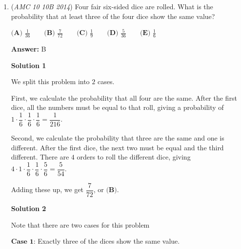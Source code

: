 \begin{enumerate}
WLOG, let $AD = 1$ and $DC = 2$. Furthermore, drop an an altitude from $F$ to $CD$, which meets $CD$ at $X$. Since $\angle ADC$ is right and has been trisected, it follows that $\triangle ADE$ and $\triangle DXF$ are both $30-60-90$ triangles. Therefore, $AE = \frac{\sqrt{3}}{3}$, and $DX = AF = \sqrt{3}$. Hence, it follows that $EF = \sqrt{3} - \frac{\sqrt{3}}{3}= \frac{2\sqrt{3}}{3}$. Since $\angle ADE$ is right, the height and base of $\triangle DEF$ are $1$ and $\frac{2\sqrt{3}}{3}$, respectively. Thus, the area of $\triangle DEF$ is $\frac{\sqrt{3}}{3}$, and the area of rectengle $ABCD$ is $2$, so the ratio beween the area of $\triangle DEF$ and $ABCD$ is $\boxed{\textbf{(A) }\frac{\sqrt{3}}{6}}$. Note that we are able to assume that $AD=1$ and $DC = 2$ because we were asked to find the ratio between two areas.

 


	\item (\textit{AMC 10 10B 2014}) Four fair six-sided dice are rolled. What is the probability that at least three of the four dice show the same value?


 $\textbf {(A) } \frac{1}{36} \qquad \textbf {(B) } \frac{7}{72} \qquad \textbf {(C) } \frac{1}{9}\qquad \textbf {(D) } \frac{5}{36} \qquad \textbf {(E) } \frac{1}{6}$

 \textbf{Answer: }B



\textbf{Solution 1}

We split this problem into $2$ cases.

 First, we calculate the probability that all four are the same. After the first dice, all the numbers must be equal to that roll, giving a probability of $1 \cdot \dfrac{1}{6} \cdot \dfrac{1}{6} \cdot \dfrac{1}{6} = \dfrac{1}{216}$.

 Second, we calculate the probability that three are the same and one is different. After the first dice, the next two must be equal and the third different. There are $4$ orders to roll the different dice, giving $4 \cdot 1 \cdot \dfrac{1}{6} \cdot \dfrac{1}{6} \cdot \dfrac{5}{6} = \dfrac{5}{54}$.

 Adding these up, we get $\dfrac{7}{72}$, or $\boxed{\textbf{(B)}}$.

 



\textbf{Solution 2}

Note that there are two cases for this problem

 $\textbf{Case 1}$: Exactly three of the dices show the same value.


\end{enumerate}
